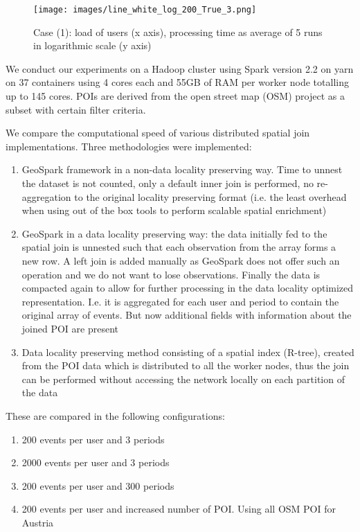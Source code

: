 \documentclass[conference]{IEEEtran}
\newcommand{\mycaption}[1]{\stepcounter{figure}%
  {\footnotesize Fig. \thefigure.\hspace{3pt} #1}}
\begin{document}
\begin{figure*}
\centering\texttt{[image: images/line\_white\_log\_200\_True\_3.png]}
\centering\caption{Case (1): load of users (x axis), processing time as average of 5 runs in logarithmic scale (y axis)}
\label{fig:results}
\end{figure*}

We conduct our experiments on a Hadoop cluster using Spark version 2.2 on yarn on 37 containers
 using 4 cores each and 55GB of RAM per worker node totalling up to 145 cores. POIs are derived from the open street map (OSM) project as a subset with certain filter criteria.

We compare the computational speed of various distributed spatial join implementations. Three methodologies were implemented: 
\begin{enumerate}
  \item GeoSpark framework in a non-data locality preserving way. Time to unnest the dataset is not counted, only a default inner join is performed, no re-aggregation to the original locality preserving format (i.e. the least overhead when using out of the box tools to perform scalable spatial enrichment)
  \item GeoSpark in a data locality preserving way: the data initially fed to the spatial join is unnested such that each observation from the array forms a new row. A left join is added manually as GeoSpark does not offer such an operation and we do not want to lose observations. Finally the data is compacted again to allow for further processing in the data locality optimized representation. I.e. it is aggregated for each user and period to contain the original array of events. But now additional fields with information about the joined POI are present
  \item Data locality preserving method consisting of a spatial index (R-tree), created from the POI data which is distributed to all the worker nodes, thus the join can be performed without accessing the network locally on each partition of the data
\end{enumerate}

These are compared in the following configurations:
\begin{enumerate}
	\item 200 events per user and 3 periods
	\item 2000 events per user and 3 periods
	\item 200 events per user and 300 periods
	\item 200 events per user and increased number of POI. Using all OSM POI for Austria
\end{enumerate}
\end{document}
